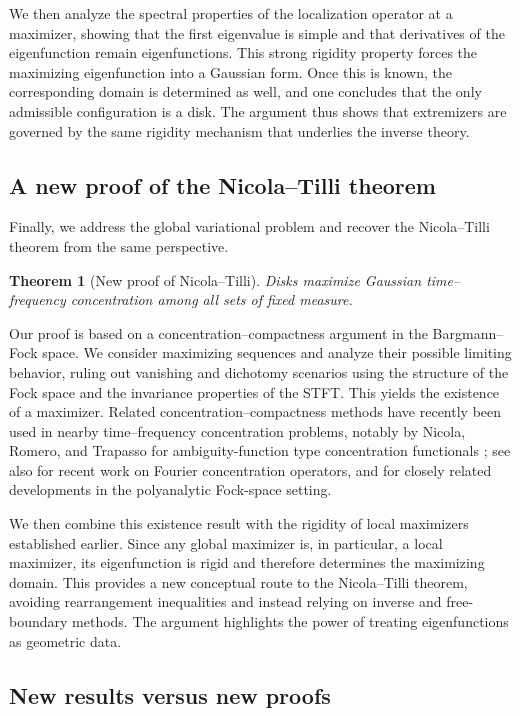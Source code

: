 \documentclass[a4paper,11pt,reqno]{amsart}
\numberwithin{equation}{section}
\theoremstyle{plain} %
\newtheorem{theorem}{Theorem}
\theoremstyle{definition} %
\theoremstyle{remark}
\begin{document}
We then analyze the spectral properties of the localization operator at a maximizer, showing that the first eigenvalue is simple and that derivatives of the eigenfunction remain eigenfunctions. This strong rigidity property forces the maximizing eigenfunction into a Gaussian form. Once this is known, the corresponding domain is determined as well, and one concludes that the only admissible configuration is a disk. The argument thus shows that extremizers are governed by the same rigidity mechanism that underlies the inverse theory.

\subsection{A new proof of the Nicola--Tilli theorem}

Finally, we address the global variational problem and recover the Nicola--Tilli theorem from the same perspective.

\begin{theorem}[New proof of Nicola--Tilli]
Disks maximize Gaussian time--frequency concentration among all sets of fixed measure.
\end{theorem}

Our proof is based on a concentration--compactness argument in the Bargmann--Fock space. We consider maximizing sequences and analyze their possible limiting behavior, ruling out vanishing and dichotomy scenarios using the structure of the Fock space and the invariance properties of the STFT. This yields the existence of a maximizer. Related concentration--compactness methods have recently been used in nearby time--frequency concentration problems, notably by Nicola, Romero, and Trapasso for ambiguity-function type concentration functionals \cite{Nicola-Romero-Trapasso}; see also \cite{Marceca-Romero-Speckbacher,Samuelsen} for recent work on Fourier concentration operators, and \cite{Fulsche-Hagger} for closely related developments in the polyanalytic Fock-space setting.

We then combine this existence result with the rigidity of local maximizers established earlier. Since any global maximizer is, in particular, a local maximizer, its eigenfunction is rigid and therefore determines the maximizing domain. This provides a new conceptual route to the Nicola--Tilli theorem, avoiding rearrangement inequalities and instead relying on inverse and free-boundary methods. The argument highlights the power of treating eigenfunctions as geometric data.

\subsection{New results versus new proofs}
\end{document}
